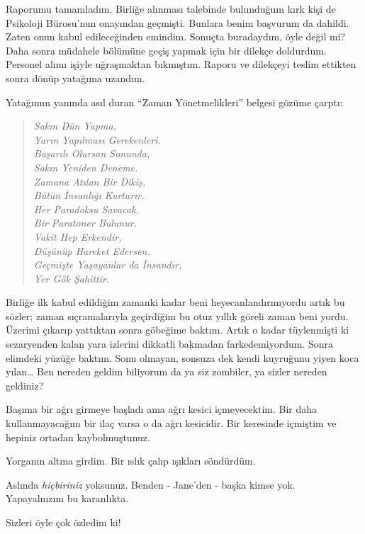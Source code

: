 Raporumu tamamladım. Birliğe alınması talebinde bulunduğum kırk kişi de
Psikoloji Bürosu'nun onayından geçmişti. Bunlara benim başvurum da dahildi.
Zaten onun kabul edileceğinden emindim. Sonuçta buradaydım, öyle değil mi? Daha
sonra müdahele bölümüne geçiş yapmak için bir dilekçe doldurdum. Personel alımı
işiyle uğraşmaktan bıkmıştım. Raporu ve dilekçeyi teslim ettikten sonra dönüp
yatağıma uzandım.

Yatağımın yanında asıl duran ``Zaman Yönetmelikleri'' belgesi gözüme çarptı:

\begin{verse}
\itshape
  Sakın Dün Yapma,\\
  \hspace{1em}Yarın Yapılması Gerekenleri.\\
  Başarılı Olursan Sonunda,\\
  \hspace{1em}Sakın Yeniden Deneme.\\
  Zamana Atılan Bir Dikiş,\\
  \hspace{1em}Bütün İnsanlığı Kurtarır.\\
  Her Paradoksu Savacak,\\
  \hspace{1em}Bir Paratoner Bulunur.\\
  Vakit Hep Erkendir,\\
  \hspace{1em}Düşünüp Hareket Edersen.\\
  Geçmişte Yaşayanlar da İnsandır,\\
  Yer Gök Şahittir.\\
\end{verse}

Birliğe ilk kabul edildiğim zamanki kadar beni heyecanlandırmıyordu artık bu
sözler; zaman sıçramalarıyla geçirdiğim bu otuz yıllık göreli zaman beni yordu.
Üzerimi çıkarıp yattıktan sonra göbeğime baktım. Artık o kadar tüylenmişti ki
sezaryenden kalan yara izlerini dikkatli bakmadan farkedemiyordum.  Sonra elimdeki
yüzüğe baktım. Sonu olmayan, sonsuza dek kendi kuyruğunu yiyen koca yılan\dots
Ben nereden geldim biliyorum da ya siz zombiler, ya sizler nereden geldiniz?

Başıma bir ağrı girmeye başladı ama ağrı kesici içmeyecektim. Bir daha
kullanmayacağım bir ilaç varsa o da ağrı kesicidir. Bir keresinde içmiştim ve
hepiniz ortadan kaybolmuştunuz.

Yorganın altına girdim. Bir ıslık çalıp ışıkları söndürdüm.

Aslında \emph{hiçbiriniz} yoksunuz. Benden - Jane'den - başka kimse yok.\\
Yapayalnızım bu karanlıkta.

Sizleri öyle çok özledim ki!
